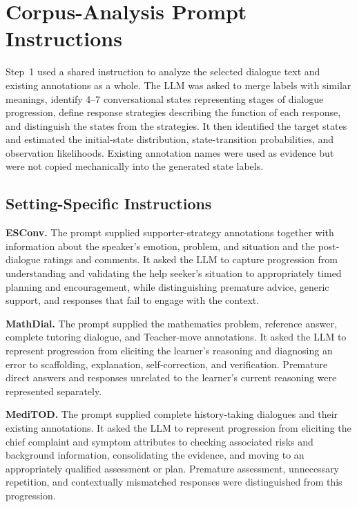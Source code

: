 \section{Corpus-Analysis Prompt Instructions}
\label{app:prompts}

Step~1 used a shared instruction to analyze the selected dialogue text and existing annotations as a whole. The LLM was asked to merge labels with similar meanings, identify 4--7 conversational states representing stages of dialogue progression, define response strategies describing the function of each response, and distinguish the states from the strategies. It then identified the target states and estimated the initial-state distribution, state-transition probabilities, and observation likelihoods. Existing annotation names were used as evidence but were not copied mechanically into the generated state labels.

\subsection{Setting-Specific Instructions}

\noindent\textbf{ESConv.} The prompt supplied supporter-strategy annotations together with information about the speaker's emotion, problem, and situation and the post-dialogue ratings and comments. It asked the LLM to capture progression from understanding and validating the help seeker's situation to appropriately timed planning and encouragement, while distinguishing premature advice, generic support, and responses that fail to engage with the context.

\noindent\textbf{MathDial.} The prompt supplied the mathematics problem, reference answer, complete tutoring dialogue, and Teacher-move annotations. It asked the LLM to represent progression from eliciting the learner's reasoning and diagnosing an error to scaffolding, explanation, self-correction, and verification. Premature direct answers and responses unrelated to the learner's current reasoning were represented separately.

\noindent\textbf{MediTOD.} The prompt supplied complete history-taking dialogues and their existing annotations. It asked the LLM to represent progression from eliciting the chief complaint and symptom attributes to checking associated risks and background information, consolidating the evidence, and moving to an appropriately qualified assessment or plan. Premature assessment, unnecessary repetition, and contextually mismatched responses were distinguished from this progression.

